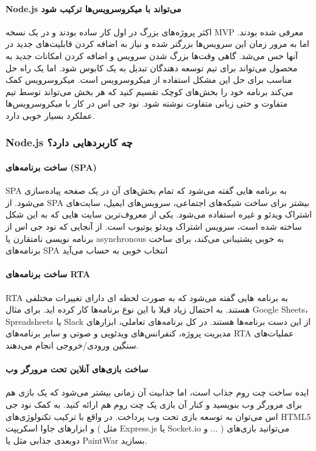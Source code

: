 \paragraph{Node.js می‌تواند با میکروسرویس‌ها ترکیب شود}
اکثر پروژه‌های بزرگ در اول کار ساده بودند و در یک نسخه MVP معرفی شده بودند. اما به مرور زمان این سرویس‌ها بزرگتر شده و نیاز به اضافه کردن قابلیت‌های جدید در آنها حس می‌شد. گاهی وقت‌ها بزرگ شدن سرویس و اضافه کردن امکانات جدید به محصول می‌تواند برای تیم توسعه دهندگان تبدیل به یک کابوس شود. اما یک راه حل مناسب برای حل این مشکل استفاده از میکروسرویس است. میکروسرویس کمک می‌کند برنامه خود را بخش‌های کوچک تقسیم کنید که هر بخش می‌تواند توسط تیم متفاوت و حتی زبانی متفاوت نوشته شود. نود جی اس در کار با میکروسرویس‌ها عملکرد بسیار خوبی دارد.


\subsubsection{Node.js چه کاربردهایی دارد؟}
\paragraph{ساخت برنامه‌های (SPA)}
SPA
به برنامه هایی گفته می‌شود که تمام بخش‌های آن در یک صفحه پیاده‌سازی می‌شود. از SPA بیشتر برای ساخت شبکه‌های اجتماعی، سرویس‌های ایمیل، سایت‌های اشتراک ویدئو و غیره استفاده می‌شود. یکی از معروف‌ترین سایت هایی که به این شکل ساخته شده است، سرویس اشتراک ویدئو یوتیوب است. از آنجایی که نود جی اس از برنامه نویسی نامتقارن یا asynchronous به خوبی پشتیبانی می‌کند، برای ساخت برنامه‌های SPA انتخاب خوبی به حساب می‌آید

\paragraph{ساخت برنامه‌های RTA}
RTA
به برنامه هایی گفته می‌شود که به صورت لحظه ای دارای تغییرات مختلفی هستند. به احتمال زیاد قبلا با این نوع برنامه‌ها کار کرده اید. برای مثال Google Sheets، Spreadsheets یا Slack از این دست برنامه‌ها هستند. در کل برنامه‌های تعاملی، ابزارهای مدیریت پروژه، کنفرانس‌های ویدئویی و صوتی و سایر برنامه‌های RTA عملیات‌های سنگین ورودی/خروجی انجام می‌دهند.

\paragraph{ساخت بازی‌های آنلاین تحت مرورگر وب}
ایده ساخت چت روم جذاب است، اما جذابیت آن زمانی بیشتر می‌شود که یک بازی هم برای مرورگر وب بنویسید و کنار آن بازی یک چت روم هم ارائه کنید. به کمک نود جی اس می‌توان به توسعه بازی تحت وب پرداخت. در واقع با ترکیب تکنولوژی‌های HTML5 و ابزارهای جاوا اسکریپت ( مثل Express.js یا Socket.io و ... ) می‌توانید بازی‌های دوبعدی جذابی مثل
 یا PaintWar بسازید.

